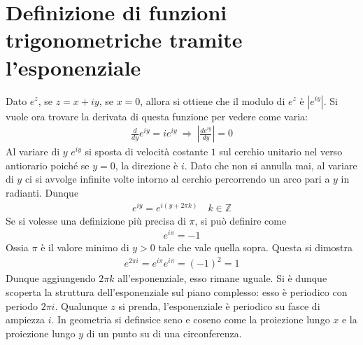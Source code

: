 \documentclass[a4paper, oneside]{article}
\begin{document}
\section{Definizione di funzioni trigonometriche tramite l'esponenziale}
Dato $e^{z}$, se $z = x + iy$, se $x = 0$, allora 
si ottiene che il modulo di $e^{z}$ è $\left| e^{iy} \right|$.
Si vuole ora trovare la derivata di questa funzione per vedere
come varia:
\begin{gather*}
    \frac{d}{dy}e^{iy} = ie^{iy} \ \Longrightarrow \ \left| \frac{de^{iy}}{dy} \right| = 0
\end{gather*} 
Al variare di $y$ $e^{iy}$ si sposta di velocità costante $1$ sul cerchio unitario 
nel verso antiorario poiché se $y = 0$, la direzione è $i$. Dato che 
non si annulla mai, al variare di $y$ ci si avvolge infinite volte intorno al cerchio 
percorrendo un arco pari a $y$ in radianti. Dunque
\begin{gather*}
    e^{iy} = e^{i(y + 2\pi k)} \quad k \in \mathbb{Z}
\end{gather*}
Se si volesse una definizione più precisa di $\pi$, si può definire come 
\begin{gather*}
    e^{i\pi} = - 1
\end{gather*}
Ossia $\pi$ è il valore minimo di $y > 0$ tale che vale quella sopra. Questa si dimostra
\begin{gather*}
    e^{2\pi i} = e^{i \pi} e^{i\pi } = (-1)^{2} = 1
\end{gather*}
Dunque aggiungendo $2\pi k $ all'esponenziale, esso rimane uguale. Si è dunque 
scoperta la struttura dell'esponenziale sul piano complesso: esso è periodico con 
periodo $2\pi i$. Qualunque $z$ si prenda, l'esponenziale è periodico su fasce di 
ampiezza $i$. In geometria si definsice seno e coseno come la proiezione lungo $x$
e la proiezione lungo $y$ di un punto su di una circonferenza. 
\end{document}
